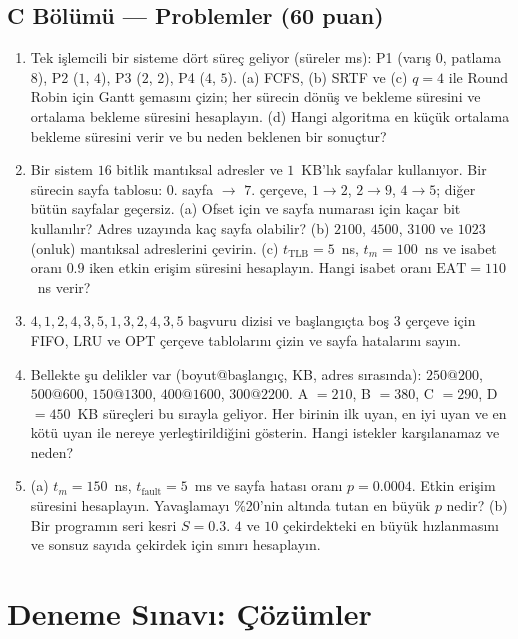 \documentclass[11pt,a4paper]{article}
\begin{document}
\subsection*{C Bölümü --- Problemler \hfill (60 puan)}
\begin{enumerate}[leftmargin=2.0em,label=C\arabic*.,itemsep=0.6em]
  \item {} Tek işlemcili bir sisteme dört süreç geliyor (süreler ms): P1 (varış $0$, patlama $8$), P2 ($1$, $4$), P3 ($2$, $2$), P4 ($4$, $5$). (a) FCFS, (b) SRTF ve (c) $q = 4$ ile Round Robin için Gantt şemasını çizin; her sürecin dönüş ve bekleme süresini ve ortalama bekleme süresini hesaplayın. (d) Hangi algoritma en küçük ortalama bekleme süresini verir ve bu neden beklenen bir sonuçtur?
  \item {} Bir sistem $16$ bitlik mantıksal adresler ve $1$~KB'lık sayfalar kullanıyor. Bir sürecin sayfa tablosu: $0$. sayfa $\to$ $7$. çerçeve, $1 \to 2$, $2 \to 9$, $4 \to 5$; diğer bütün sayfalar geçersiz.
  (a) Ofset için ve sayfa numarası için kaçar bit kullanılır? Adres uzayında kaç sayfa olabilir?
  (b) $2100$, $4500$, $3100$ ve $1023$ (onluk) mantıksal adreslerini çevirin.
  (c) $t_{\text{TLB}} = 5$~ns, $t_m = 100$~ns ve isabet oranı $0.9$ iken etkin erişim süresini hesaplayın. Hangi isabet oranı $\text{EAT} = 110$~ns verir?
  \item {} $4, 1, 2, 4, 3, 5, 1, 3, 2, 4, 3, 5$ başvuru dizisi ve başlangıçta boş $3$ çerçeve için FIFO, LRU ve OPT çerçeve tablolarını çizin ve sayfa hatalarını sayın.
  \item {} Bellekte şu delikler var (boyut@başlangıç, KB, adres sırasında): $250@200$, $500@600$, $150@1300$, $400@1600$, $300@2200$. A $=210$, B $=380$, C $=290$, D $=450$~KB süreçleri bu sırayla geliyor. Her birinin ilk uyan, en iyi uyan ve en kötü uyan ile nereye yerleştirildiğini gösterin. Hangi istekler karşılanamaz ve neden?
  \item {} (a) $t_m = 150$~ns, $t_{\text{fault}} = 5$~ms ve sayfa hatası oranı $p = 0.0004$. Etkin erişim süresini hesaplayın. Yavaşlamayı \%20'nin altında tutan en büyük $p$ nedir?
  (b) Bir programın seri kesri $S = 0.3$. $4$ ve $10$ çekirdekteki en büyük hızlanmasını ve sonsuz sayıda çekirdek için sınırı hesaplayın.
\end{enumerate}

\newpage
\section{Deneme Sınavı: Çözümler}
\label{sec:solutions}
\end{document}
